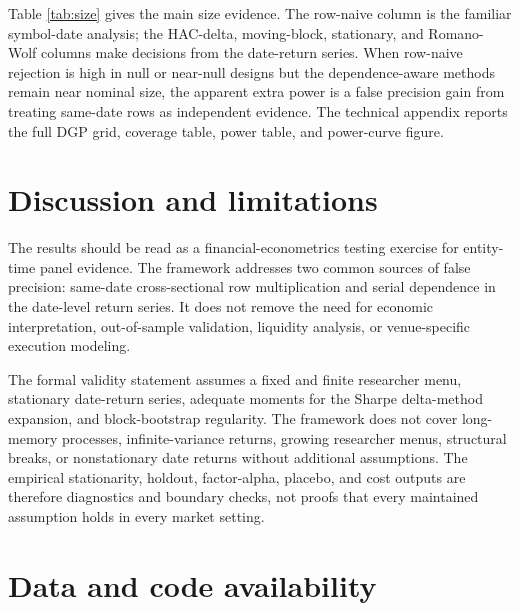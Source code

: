 \documentclass[12pt,a4paper]{article}
\begin{document}
Table \ref{tab:size} gives the main size evidence.  The row-naive column is the familiar
symbol-date analysis; the HAC-delta, moving-block, stationary, and
Romano-Wolf columns make decisions from the date-return series.  When
row-naive rejection is high in null or near-null designs but the
dependence-aware methods remain near nominal size, the apparent extra
power is a false precision gain from treating same-date rows as
independent evidence.  The technical appendix reports the full DGP grid,
coverage table, power table, and power-curve figure.



\section{Discussion and limitations}

The results should be read as a financial-econometrics testing exercise
for entity-time panel evidence.  The framework addresses two common
sources of false precision: same-date cross-sectional row multiplication
and serial dependence in the date-level return series.  It does not
remove the need for economic interpretation, out-of-sample validation,
liquidity analysis, or venue-specific execution modeling.

The formal validity statement assumes a fixed and finite researcher menu,
stationary date-return series, adequate moments for the Sharpe
delta-method expansion, and block-bootstrap regularity.  The framework
does not cover long-memory processes, infinite-variance returns, growing
researcher menus, structural breaks, or nonstationary date returns
without additional assumptions.  The empirical stationarity, holdout,
factor-alpha, placebo, and cost outputs are therefore diagnostics and
boundary checks, not proofs that every maintained assumption holds in
every market setting.

\section{Data and code availability}
\end{document}

